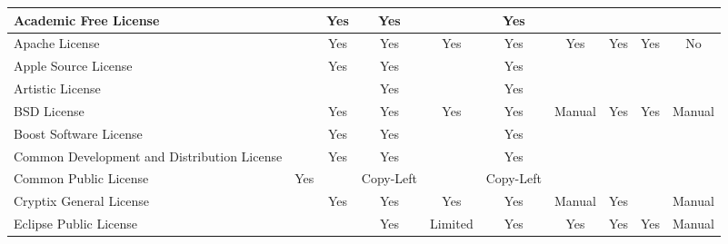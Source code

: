\begin{frame}
{\begin{tabular}{lccccccccc}
      Academic Free License                       &                         & Yes                    & Yes                       &           & Yes                  &        &          &                      &        \\ \hline
      Apache License                              &                         & Yes                    & Yes                       & Yes       & Yes                  & Yes    & Yes      & Yes                  & No     \\ \hline
      Apple Source License                        &                         & Yes                    & Yes                       &           & Yes \footnotemark[8] &        &          &                      &        \\ \hline
      Artistic License                            &                         &                        & Yes \footnotemark[7]      &           & Yes \footnotemark[7] &        &          &                      &        \\ \hline
      BSD License                                 &                         & Yes                    & Yes                       & Yes       & Yes                  & Manual & Yes      & Yes                  & Manual \\ \hline
      Boost Software License                      &                         & Yes                    & Yes                       &           & Yes                  &        &          &                      &        \\ \hline
      Common Development and Distribution License &                         & Yes                    & Yes                       &           & Yes \footnotemark[7] &        &          &                      &        \\ \hline
      Common Public License                       & Yes                     &                        & Copy-Left                 &           & Copy-Left            &        &          &                      &        \\ \hline
      Cryptix General License                     &                         & Yes                    & Yes                       & Yes       & Yes                  & Manual & Yes      &                      & Manual \\ \hline
      Eclipse Public License                      &                         &                        & Yes \footnotemark[7]      & Limited   & Yes \footnotemark[7] & Yes    & Yes      & Yes \footnotemark[7] & Manual \\ \hline

\end{tabular}}
\end{frame}
